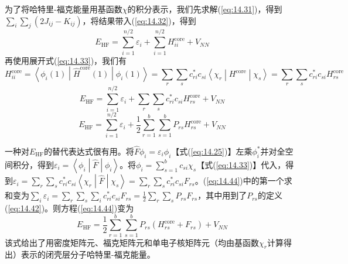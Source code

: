     为了将哈特里-福克能量用基函数$\chi$的积分表示，我们先求解(\ref{eq:14.31})，得到$\sum_i \sum_j \left(2J_{ij} - K_{ij}\right)$，将结果带入(\ref{eq:14.32})，得到
    \begin{equation*}
        E_{\text{HF}} = \sum_{i=1}^{n/2} \varepsilon_i + \sum_{i=1}^{n/2} H^{\text{core}}_{ii} + V_{NN}
    \end{equation*}
    再使用展开式(\ref{eq:14.33})，我们有
    \begin{equation*}
        H^{\text{core}}_{ii} = \left\langle \phi_i \left(1\right) \middle| \hat{H}^{\text{core}} \left(1\right) \middle| \phi_i \left(1\right) \right\rangle = \sum_{r} \sum_{s} c_{ri}^* c_{si} \left\langle \chi_r \middle| H^{\text{core}} \middle| \chi_s \right\rangle = \sum_{r} \sum_{s} c_{ri}^* c_{si} H^{\text{core}}_{rs}
    \end{equation*}
    \begin{equation*}
        E_{\text{HF}} = \sum_{i=1}^{n/2} \varepsilon_i + \sum_{r} \sum_{s} c_{ri}^* c_{si} H^{\text{core}}_{rs} + V_{NN}
    \end{equation*}
    \begin{equation}
        E_{\text{HF}} = \sum_{i=1}^{n/2} \varepsilon_i + \frac{1}{2} \sum_{r=1}^{b} \sum_{s=1}^{b} P_{rs} H^{\text{core}}_{rs} + V_{NN}
        \label{eq:14.44}
    \end{equation}

    一种对$E_{\text{HF}}$的替代表达式很有用。将$\hat{F}\phi_i = \varepsilon_i \phi_i$【式(\ref{eq:14.25})】左乘$\phi_i^*$并对全空间积分，得到$\varepsilon_i = \left\langle \phi_i \middle| \hat{F} \middle| \phi_i \right\rangle$。将$\phi_i = \sum_{s=1}^{b} c_{si} \chi_s$【式(\ref{eq:14.33})】代入，得到$\varepsilon_i =  \sum_r \sum_s c_{ri}^* c_{si} \left\langle \chi_r \middle| \hat{F} \middle| \chi_s \right\rangle = \sum_r \sum_s c_{ri}^* c_{si} F_{rs}$。(\ref{eq:14.44})中的第一个求和变为$\sum_i \varepsilon_i = \sum_r \sum_s \sum_i c_{ri}^* c_{si} F_{rs} = \frac{1}{2} \sum_r \sum_s P_{rs} F_{rs}$，其中用到了$P_{rs}$的定义(\ref{eq:14.42})。则方程(\ref{eq:14.44})变为
    \begin{equation}
        E_{\text{HF}} = \frac{1}{2} \sum_{r=1}^{b} \sum_{s=1}^{b} P_{rs} \left( H^{\text{core}}_{rs} + F_{rs} \right) + V_{NN}
        \label{eq:14.45}
    \end{equation}
    该式给出了用密度矩阵元、福克矩阵元和单电子核矩阵元（均由基函数$\chi_r$计算得出）表示的闭壳层分子哈特里-福克能量。

